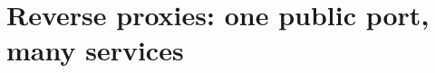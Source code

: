 \chapter{Reverse proxies: one public port, many services}
\label{ch:reverse-proxies-one-public-port-many}

